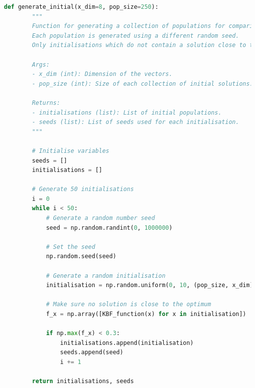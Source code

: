 \documentclass[10pt]{article}
\begin{document}
\begin{lstlisting}[language=Python, caption=helper\_functions.py, label=helper_functionspy]
    def generate_initial(x_dim=8, pop_size=250):
        """
        Function for generating a collection of populations for comparison section.
        Each population is generated using a different random seed.
        Only initialisations which do not contain a solution close to the optimum are kept.
    
        Args:
        - x_dim (int): Dimension of the vectors.
        - pop_size (int): Size of each collection of initial solutions.
    
        Returns:
        - initialisations (list): List of initial populations.
        - seeds (list): List of seeds used for each initialisation.
        """
        
        # Initialise variables
        seeds = []
        initialisations = []
    
        # Generate 50 initialisations
        i = 0
        while i < 50:
            # Generate a random number seed
            seed = np.random.randint(0, 1000000)
    
            # Set the seed
            np.random.seed(seed)
    
            # Generate a random initialisation
            initialisation = np.random.uniform(0, 10, (pop_size, x_dim))
    
            # Make sure no solution is close to the optimum
            f_x = np.array([KBF_function(x) for x in initialisation])
            
            if np.max(f_x) < 0.3:
                initialisations.append(initialisation)
                seeds.append(seed)
                i += 1
    
        return initialisations, seeds    
\end{lstlisting}
\end{document}
